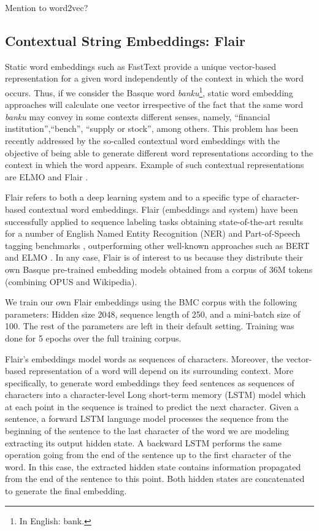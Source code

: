 \documentclass[10pt, a4paper]{article}
\begin{document}
Mention to word2vec?


\subsection{Contextual String Embeddings: Flair}\label{sec:build-basq-models:flair}

Static word embeddings such as FastText \cite{fasttext1_bojanowski2017enriching} provide a unique vector-based representation for a given word independently of the context in which the word occurs. Thus, if we consider the Basque word \emph{banku}\footnote{In English: bank.}, static word embedding approaches will calculate one vector irrespective of the fact that the same word \emph{banku} may convey in some contexts different senses, namely, ``financial institution'',``bench'', ``supply or stock'', among others. This problem has been recently addressed by the so-called contextual word embeddings with the objective of being able to generate different word representations according to the context in which the word appears. Example of such contextual representations are ELMO \cite{Peters:2018} and Flair \cite{akbik2018coling}.

Flair refers to both a deep learning system and to a specific type of character-based contextual word embeddings. Flair (embeddings and system) have been successfully applied to sequence labeling tasks obtaining state-of-the-art results for a number of English Named Entity Recognition (NER) and Part-of-Speech tagging benchmarks \cite{akbik2018coling}, outperforming other well-known approaches such as BERT and ELMO \cite{devlin2019bert,Peters:2018}. In any case, Flair is of interest to us because they distribute their own Basque pre-trained embedding models obtained from a corpus of 36M tokens (combining OPUS and Wikipedia).

We train our own Flair embeddings using the BMC corpus with the following parameters: Hidden size 2048, sequence length of 250, and a mini-batch size of 100. The rest of the parameters are left in their default setting. Training was done for 5 epochs over the full training corpus.

Flair's embeddings model words as sequences of characters. Moreover, the vector-based representation of a word will depend on its surrounding context. More specifically, to generate word embeddings they feed sentences as sequences of characters into a character-level Long short-term memory (LSTM) model which at each point in the sequence is trained to predict the next character. Given a sentence, a forward LSTM language model processes the sequence from the beginning of the sentence to the last character of the word we are modeling extracting its output hidden state. A backward LSTM performs the same operation going from the end of the sentence up to the first character of the word. In this case, the extracted hidden state contains information propagated from the end of the sentence to this point. Both hidden states are concatenated to generate the final embedding.
\end{document}
